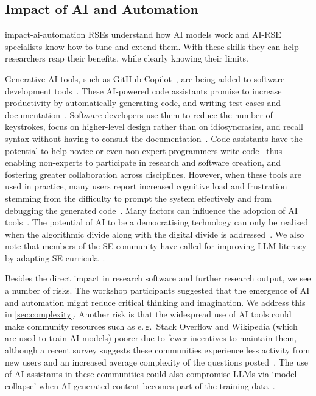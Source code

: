 \documentclass{eceasst}
\newcommand{\eg}{e.\,g.}
\begin{document}
\subsection{Impact of AI and Automation}
\label{sec:ai}
\begin{whatis}{}{impact-ai-automation}
RSEs understand how AI models work and AI-RSE specialists know how to tune and extend them.
With these skills they can help researchers reap their benefits,
while clearly knowing their limits.
\end{whatis}
Generative AI tools, such as GitHub Copilot~\cite{Friedmann2021},
are being added to software development tools~\cite{Alenezi2025}.
These AI-powered code assistants promise to increase productivity
by automatically generating code, and writing test cases and documentation~\cite{Banh2025}.
Software developers use them to reduce the number of keystrokes,
focus on higher-level design rather than on idiosyncrasies,
and recall syntax without having to consult the documentation~\cite{Liang2024}.
Code assistants have the potential to help novice or even non-expert programmers
write code~\cite{Feldman2024} thus enabling non-experts to participate in research
and software creation, and fostering greater collaboration across disciplines.
However, when these tools are used in practice, many users report increased cognitive
load and frustration stemming from the difficulty to prompt the system effectively
and from debugging the generated code~\cite{Simkute2025}.
Many factors can influence the adoption of AI tools~\cite{Russo2024}.
The potential of AI to be a democratising technology can only be realised
when the algorithmic divide along with the digital divide is addressed~\cite{Yu2020}.
We also note that members of the SE community have called for improving LLM literacy
by adapting SE curricula~\cite{Kirova2024}.

Besides the direct impact in research software and further research output,
we see a number of risks.
The workshop participants suggested that the emergence of AI and automation might reduce critical thinking and imagination.
We address this in \autoref{sec:complexity}.
Another risk is that the widespread use of AI tools could make community resources
such as \eg\ Stack Overflow and Wikipedia (which are used to train AI models) poorer
due to fewer incentives to maintain them, although a recent survey suggests
these communities experience less activity from new users and an increased
average complexity of the questions posted~\cite{Burtch2024}.
The use of AI assistants in these communities could also compromise LLMs via `model collapse'
when AI-generated content becomes part of the training data~\cite{Shumailov2024}.
\end{document}
